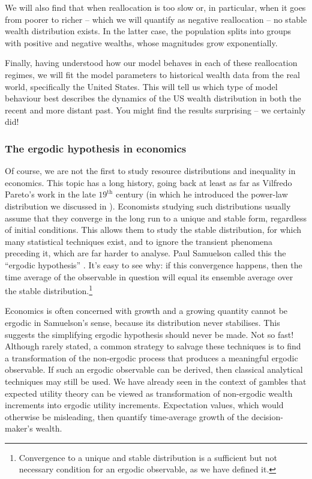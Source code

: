 We will also find that when reallocation is too slow or, in particular, when it goes from poorer to richer -- which we will quantify as negative reallocation -- no stable wealth distribution exists. In the latter case, the population splits into groups with positive and negative wealths, whose magnitudes grow exponentially.

Finally, having understood how our model behaves in each of these reallocation regimes, we will fit the model parameters to historical wealth data from the real world, specifically the United States. This will tell us which type of model behaviour best describes the dynamics of the US wealth distribution in both the recent and more distant past. You might find the results surprising -- we certainly did!


\subsubsection{The ergodic hypothesis in economics}
Of course, we are not the first to study resource distributions and inequality in economics. This topic has a long history, going back at least as far as Vilfredo Pareto's work in the late $19^\text{th}$ century \cite{Pareto1897} (in which he introduced the power-law distribution we discussed in ). Economists studying such distributions usually assume that they converge in the long run to a unique and stable form, regardless of initial conditions. This allows them to study the stable distribution, for which many statistical techniques exist, and to ignore the transient phenomena preceding it, which are far harder to analyse. Paul Samuelson called this the ``ergodic hypothesis'' \cite[pp.~11-12]{Samuelson1968}. It's easy to see why: if this convergence happens, then the time average of the observable in question will equal its ensemble average over the stable distribution.\footnote{Convergence to a unique and stable distribution is a sufficient but not necessary condition for an ergodic observable, as we have defined it.}

Economics is often concerned with growth and a growing quantity cannot be ergodic in Samuelson's sense, because its distribution never stabilises. This suggests the simplifying ergodic hypothesis should never be made. Not so fast! Although rarely stated, a common strategy to salvage these techniques is to find a transformation of the non-ergodic process that produces a meaningful ergodic observable. If such an ergodic observable can be derived, then classical analytical techniques may still be used. We have already seen in the context of gambles that expected utility theory can be viewed as transformation of non-ergodic wealth increments into ergodic utility increments. Expectation values, which would otherwise be misleading, then quantify time-average growth of the decision-maker's wealth.

